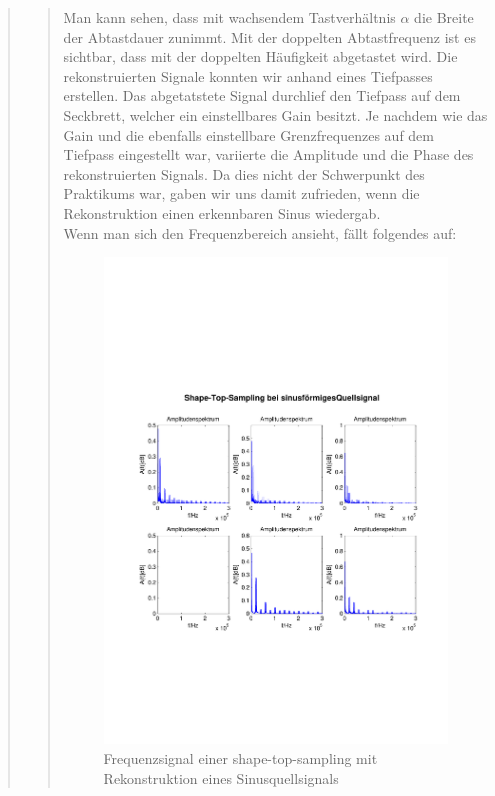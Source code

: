 \begin{quote}
\begin{quote}
      	    Man kann sehen, dass mit wachsendem Tastverhältnis $\alpha$ die Breite
      	    der Abtastdauer zunimmt. Mit der doppelten Abtastfrequenz ist es
      	    sichtbar, dass mit der doppelten Häufigkeit abgetastet wird. Die
      	    rekonstruierten Signale konnten wir anhand eines Tiefpasses erstellen.
      	    Das abgetatstete Signal durchlief den Tiefpass auf dem Seckbrett,
      	    welcher ein einstellbares Gain besitzt. Je nachdem wie das Gain und die
      	    ebenfalls einstellbare Grenzfrequenzes auf dem Tiefpass eingestellt
      	    war, variierte die Amplitude und die Phase des rekonstruierten Signals.
      	    Da dies nicht der Schwerpunkt des Praktikums war, gaben wir uns damit
      	    zufrieden, wenn die Rekonstruktion einen erkennbaren Sinus wiedergab.\\
      	    
      	    Wenn man sich den Frequenzbereich ansieht, fällt folgendes auf:
      	    
      	    
        	\begin{figure}[H]
            \centering
            \includegraphics[scale=0.6, trim = 1.5cm 6cm 1cm 8cm,
            clip]{./Bilder/shape-top-sinus_freq}
                \caption{Frequenzsignal einer shape-top-sampling mit Rekonstruktion
                eines Sinusquellsignals}
      	    \end{figure}
      	    

\end{quote}
\end{quote}
